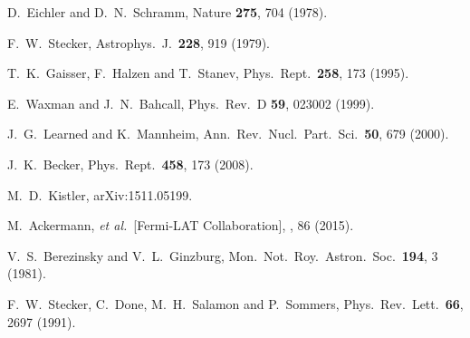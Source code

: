 \documentclass[aps,prd,nofootinbib,twocolumn,floatfix,letterpaper,superscriptaddress,showpacs]{revtex4}
\begin{document}
\begin{thebibliography}{99}
  D.~Eichler and D.~N.~Schramm,
  Nature {\bf 275}, 704 (1978).

  F.~W.~Stecker,
  Astrophys.\ J.\  {\bf 228}, 919 (1979).

  T.~K.~Gaisser, F.~Halzen and T.~Stanev,
  Phys.\ Rept.\  {\bf 258}, 173 (1995).

  E.~Waxman and J.~N.~Bahcall,
  Phys.\ Rev.\ D {\bf 59}, 023002 (1999).

  J.~G.~Learned and K.~Mannheim,
  Ann.\ Rev.\ Nucl.\ Part.\ Sci.\  {\bf 50}, 679 (2000).


  J.~K.~Becker,
  Phys.\ Rept.\  {\bf 458}, 173 (2008).



  M.~D.~Kistler,
  arXiv:1511.05199.


  M.\ Ackermann, {\it et al.}\ [Fermi-LAT Collaboration],
  , 86 (2015).



  V.~S.~Berezinsky and V.~L.~Ginzburg,
  Mon.\ Not.\ Roy.\ Astron.\ Soc.\  {\bf 194}, 3 (1981).

  F.~W.~Stecker, C.~Done, M.~H.~Salamon and P.~Sommers,
  Phys.\ Rev.\ Lett.\  {\bf 66}, 2697 (1991).


\end{thebibliography}
\end{document}
